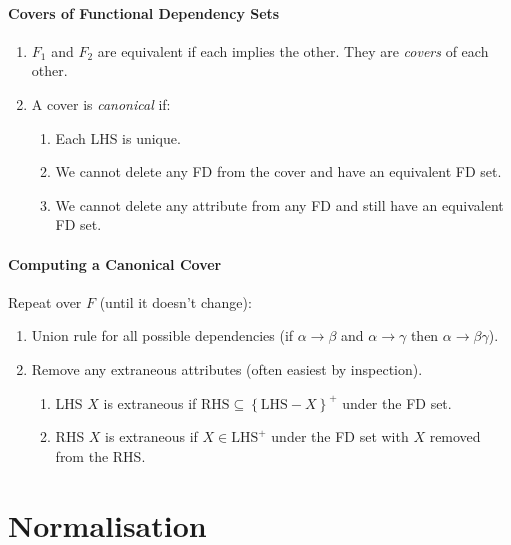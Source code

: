 \documentclass[twocolumn,english]{article}
\begin{document}
\paragraph{Covers of Functional Dependency Sets}
\begin{enumerate}
\item $F_{1}$ and $F_{2}$ are equivalent if each implies the other. They
are \emph{covers} of each other.
\item A cover is \emph{canonical} if:

\begin{enumerate}
\item Each LHS is unique.
\item We cannot delete any FD from the cover and have an equivalent FD set.
\item We cannot delete any attribute from any FD and still have an equivalent
FD set.
\end{enumerate}
\end{enumerate}

\paragraph{Computing a Canonical Cover}

Repeat over $F$ (until it doesn't change):
\begin{enumerate}
\item Union rule for all possible dependencies (if $\alpha\rightarrow\beta$
and $\alpha\rightarrow\gamma$ then $\alpha\rightarrow\beta\gamma$).
\item Remove any extraneous attributes (often easiest by inspection).

\begin{enumerate}
\item LHS $X$ is extraneous if $\mbox{RHS}\subseteq\left\{ \mbox{LHS}-X\right\} ^{+}$
under the FD set.
\item RHS $X$ is extraneous if $X\in\mbox{LHS}^{+}$ under the FD set with
$X$ removed from the RHS.
\end{enumerate}
\end{enumerate}

\section{Normalisation}
\end{document}
